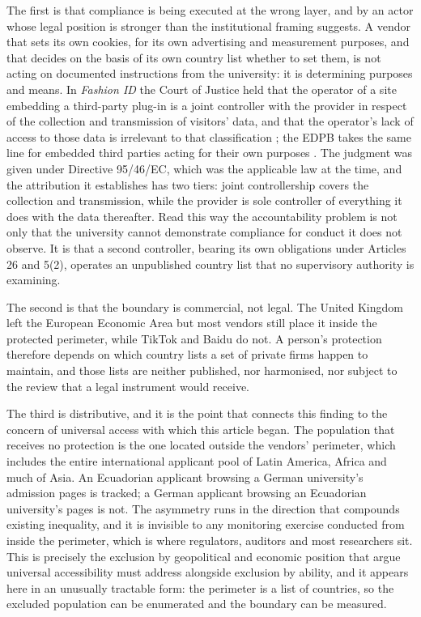 \documentclass[pdflatex,sn-basic,Numbered,iicol]{sn-jnl}
\theoremstyle{thmstyleone}
\theoremstyle{thmstyletwo}
\theoremstyle{thmstylethree}
\begin{document}
The first is that compliance is being executed at the wrong layer, and by an actor whose legal position is stronger than the institutional framing suggests. A vendor that sets its own cookies, for its own advertising and measurement purposes, and that decides on the basis of its own country list whether to set them, is not acting on documented instructions from the university: it is determining purposes and means. In \emph{Fashion ID} the Court of Justice held that the operator of a site embedding a third-party plug-in is a joint controller with the provider in respect of the collection and transmission of visitors' data, and that the operator's lack of access to those data is irrelevant to that classification \citep{cjeu2019fashionid}; the EDPB takes the same line for embedded third parties acting for their own purposes \citep{edpb2021controller}. The judgment was given under Directive 95/46/EC, which was the applicable law at the time, and the attribution it establishes has two tiers: joint controllership covers the collection and transmission, while the provider is sole controller of everything it does with the data thereafter. Read this way the accountability problem is not only that the university cannot demonstrate compliance for conduct it does not observe. It is that a second controller, bearing its own obligations under Articles 26 and 5(2), operates an unpublished country list that no supervisory authority is examining.

The second is that the boundary is commercial, not legal. The United Kingdom left the European Economic Area but most vendors still place it inside the protected perimeter, while TikTok and Baidu do not. A person's protection therefore depends on which country lists a set of private firms happen to maintain, and those lists are neither published, nor harmonised, nor subject to the review that a legal instrument would receive.

The third is distributive, and it is the point that connects this finding to the concern of universal access with which this article began. The population that receives no protection is the one located outside the vendors' perimeter, which includes the entire international applicant pool of Latin America, Africa and much of Asia. An Ecuadorian applicant browsing a German university's admission pages is tracked; a German applicant browsing an Ecuadorian university's pages is not. The asymmetry runs in the direction that compounds existing inequality, and it is invisible to any monitoring exercise conducted from inside the perimeter, which is where regulators, auditors and most researchers sit. This is precisely the exclusion by geopolitical and economic position that \citet{abascal2016rethinking} argue universal accessibility must address alongside exclusion by ability, and it appears here in an unusually tractable form: the perimeter is a list of countries, so the excluded population can be enumerated and the boundary can be measured.
\end{document}

